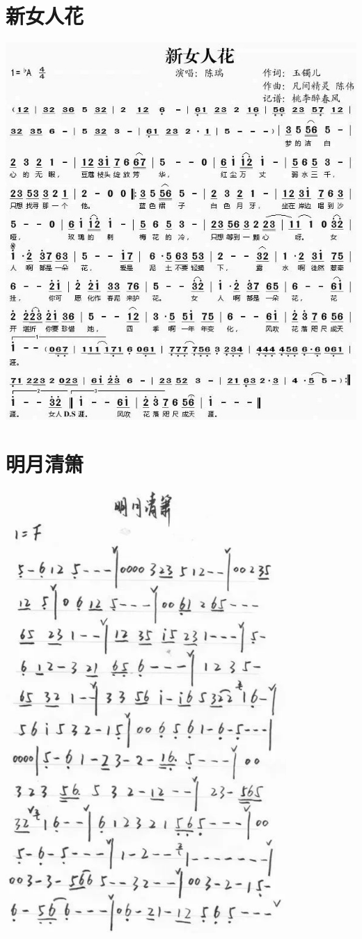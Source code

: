 \documentclass[cn,pad,twocol]{elegantbook}
\begin{document}
\section{新女人花}\includegraphics[width=\textwidth]{dongxiao/20200819/新女人花.jpeg}
\section{明月清箫}\includegraphics[width=0.8\textwidth]{dongxiao/20200819/明月清箫.png}
\end{document}
